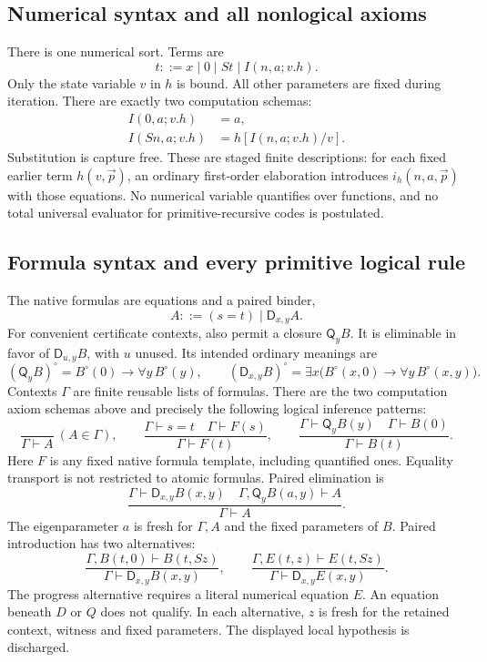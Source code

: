 \documentclass[11pt,letterpaper]{article}
\theoremstyle{definition}\newtheorem{definition}[theorem]{Definition}
\theoremstyle{remark}\newtheorem{remark}[theorem]{Remark}
\newcommand{\D}{\mathsf D}
\newcommand{\Q}{\mathsf Q}
\begin{document}
\subsection{Numerical syntax and all nonlogical axioms}

There is one numerical sort. Terms are
\[
 t ::= x\mid 0\mid St\mid I(n,a;v.h).
\]
Only the state variable \(v\) in \(h\) is bound. All other parameters
are fixed during iteration. There are exactly two computation schemas:
\begin{align}
 I(0,a;v.h)&=a,\tag{I0}\label{eq:i0}\\
 I(Sn,a;v.h)&=h[I(n,a;v.h)/v].\tag{IS}\label{eq:is}
\end{align}
Substitution is capture free. These are staged finite descriptions:
for each fixed earlier term \(h(v,\vec p)\), an ordinary first-order
elaboration introduces \(i_h(n,a,\vec p)\) with those equations.
No numerical variable quantifies over functions, and no total universal
evaluator for primitive-recursive codes is postulated.

\subsection{Formula syntax and every primitive logical rule}

The native formulas are equations and a paired binder,
\[
 A ::= (s=t)\mid \D_{x,y}A.
\]
For convenient certificate contexts, also permit a closure \(\Q_yB\).
It is eliminable in favor of \(\D_{u,y}B\), with \(u\) unused.
Its intended ordinary meanings are
\[
 (\Q_yB)^\circ=B^\circ(0)\to\forall y\,B^\circ(y),
 \qquad
 (\D_{x,y}B)^\circ=
 \exists x\bigl(B^\circ(x,0)\to\forall y\,B^\circ(x,y)\bigr).
\]
Contexts \(\Gamma\) are finite reusable lists of formulas. There are
the two computation axiom schemas above and precisely the following
logical inference patterns:
\[
 \frac{}{\Gamma\vdash A}\ (A\in\Gamma),\qquad
 \frac{\Gamma\vdash s=t\quad\Gamma\vdash F(s)}
      {\Gamma\vdash F(t)},\qquad
 \frac{\Gamma\vdash\Q_yB(y)\quad\Gamma\vdash B(0)}
      {\Gamma\vdash B(t)}.
 \tag{Hyp, Tr, QE}
\]
Here \(F\) is any fixed native formula template, including quantified
ones. Equality transport is not restricted to atomic formulas. Paired
elimination is
\[
 \frac{\Gamma\vdash\D_{x,y}B(x,y)\quad
       \Gamma,\Q_yB(a,y)\vdash A}{\Gamma\vdash A}.
 \tag{DE}
\]
The eigenparameter \(a\) is fresh for \(\Gamma,A\) and the fixed
parameters of \(B\). Paired introduction has two alternatives:
\[
 \frac{\Gamma,B(t,0)\vdash B(t,Sz)}
      {\Gamma\vdash\D_{x,y}B(x,y)},\qquad
 \frac{\Gamma,E(t,z)\vdash E(t,Sz)}
      {\Gamma\vdash\D_{x,y}E(x,y)}.
 \tag{DI-case, DI-progress}
\]
The progress alternative requires a literal numerical equation \(E\).
An equation beneath \(D\) or \(Q\) does not qualify. In each
alternative, \(z\) is fresh for the retained context, witness and
fixed parameters. The displayed local hypothesis is discharged.
\end{document}

